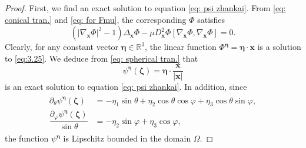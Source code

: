 \documentclass[reqno,12pt]{amsart}
\numberwithin{equation}{section}
\begin{document}
\begin{proof}
	 First, we find an exact solution to equation \eqref{eq: psi zhankai}. From \eqref{eq: conical tran.} and \eqref{eq: for Fmu}, the corresponding $\Phi$ satisfies
	\begin{equation}\label{eq:3.25}
		(|\nabla_{\bm{x}}\Phi|^2-1)\Delta_{\bm{x}}\Phi-\mu D^2_{\bm{x}}\Phi[\nabla_{\bm{x}}\Phi,\nabla_{\bm{x}}\Phi]=0.
	\end{equation}
     Clearly, for any constant vector $\bm{\eta}\in \mathbb{R}^{3}$, the linear function $\Phi^{\bm{\eta}}=\bm{\eta}\cdot\bm{x}$ is a solution to \eqref{eq:3.25}. We deduce from \eqref{eq: spherical tran.} that
	\begin{equation}\label{eq:3.26}
		{\psi}^{\bm{\eta}}(\bm{\zeta})=\bm{\eta}\cdot\frac{\bm{x}}{|\bm{x}|}
	\end{equation}
	is an exact solution to equation \eqref{eq: psi zhankai}. In addition, since
	\begin{align}\label{eq: d phi first}
            \begin{split}
	    \partial_\theta {\psi}^{\bm{\eta}}(\bm{\zeta})&=-\eta_1\sin\theta+\eta_2\cos\theta\cos\varphi+\eta_3\cos\theta\sin\varphi,\\
            \dfrac{\partial_\varphi {\psi}^{\bm{\eta}}(\bm{\zeta})}{\sin\theta}&=-\eta_2 \sin\varphi+\eta_3\cos\varphi,
            \end{split}
	\end{align}	
    the function ${\psi}^{\bm{\eta}}$ is Lipschitz bounded in the domain $\Omega$.
    

\end{proof}
\end{document}
